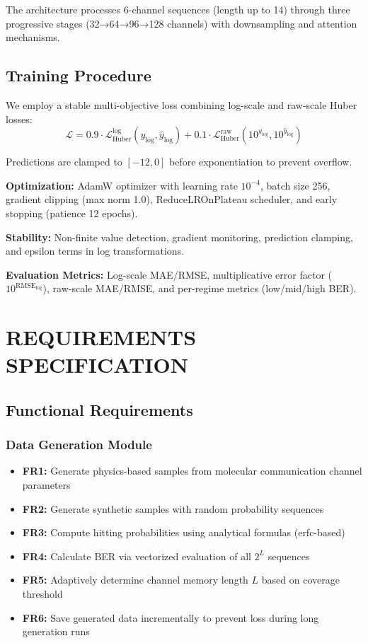\documentclass[a4paper,12pt]{report}
\begin{document}
The architecture processes 6-channel sequences (length up to 14) through three progressive stages (32→64→96→128 channels) with downsampling and attention mechanisms.

\section{Training Procedure}

We employ a stable multi-objective loss combining log-scale and raw-scale Huber losses:
\begin{equation}
\mathcal{L} = 0.9 \cdot \mathcal{L}_{\text{Huber}}^{\log}(y_{\log}, \hat{y}_{\log}) + 0.1 \cdot \mathcal{L}_{\text{Huber}}^{\text{raw}}(10^{y_{\log}}, 10^{\hat{y}_{\log}})
\end{equation}

Predictions are clamped to $[-12, 0]$ before exponentiation to prevent overflow.

\textbf{Optimization:} AdamW optimizer with learning rate $10^{-4}$, batch size 256, gradient clipping (max norm 1.0), ReduceLROnPlateau scheduler, and early stopping (patience 12 epochs).

\textbf{Stability:} Non-finite value detection, gradient monitoring, prediction clamping, and epsilon terms in log transformations.

\textbf{Evaluation Metrics:} Log-scale MAE/RMSE, multiplicative error factor ($10^{\text{RMSE}_{\log}}$), raw-scale MAE/RMSE, and per-regime metrics (low/mid/high BER).

\chapter{REQUIREMENTS SPECIFICATION}

\section{Functional Requirements}

\subsection{Data Generation Module}
\begin{itemize}
    \item \textbf{FR1:} Generate physics-based samples from molecular communication channel parameters
    \item \textbf{FR2:} Generate synthetic samples with random probability sequences
    \item \textbf{FR3:} Compute hitting probabilities using analytical formulas (erfc-based)
    \item \textbf{FR4:} Calculate BER via vectorized evaluation of all $2^L$ sequences
    \item \textbf{FR5:} Adaptively determine channel memory length $L$ based on coverage threshold
    \item \textbf{FR6:} Save generated data incrementally to prevent loss during long generation runs
\end{itemize}
\end{document}
